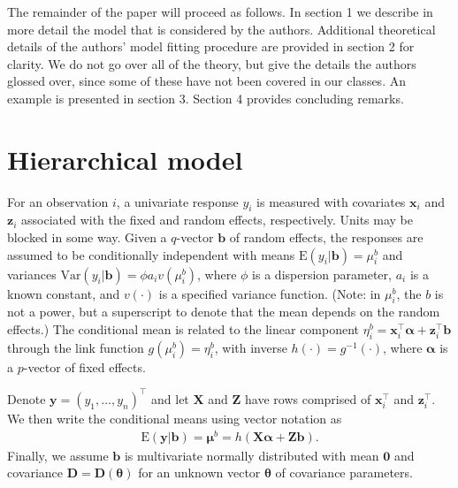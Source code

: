 \documentclass[12pt]{article}
\newcommand{\m}[1]{\mathbf{\bm{#1}}}
\newcommand{\E}{\mathrm{E}}
\newcommand{\Var}{\mathrm{Var}}
\begin{document}
The remainder of the paper will proceed as follows. In section 1 we describe in more detail the model that is considered by the authors. Additional theoretical details of the authors' model fitting procedure are provided in section 2 for clarity. We do not go over all of the theory, but give the details the authors glossed over, since some of these have not been covered in our classes. An example is presented in section 3. Section 4 provides concluding remarks.

\section{Hierarchical model}
 
\noindent For an observation $i$, a univariate response $y_i$ is measured with covariates $\m{x}_i$ and $\m{z}_i$ associated with the fixed and random effects, respectively. Units may be blocked in some way. Given a $q$-vector $\m{b}$ of random effects, the responses are assumed to be conditionally independent with means $\E(y_i|\m{b})=\mu_i^b$ and variances $\Var(y_i|\m{b}) = \phi a_i v(\mu_i^b)$, where $\phi$ is a dispersion parameter, $a_i$ is a known constant, and $v(\cdot)$ is a specified variance function. (Note: in $\mu_i^b$, the $b$ is not a power, but a superscript to denote that the mean depends on the random effects.) The conditional mean is related to the linear component $\eta_i^b=\m{x}_i^\top\m{\alpha}+\m{z}_i^\top\m{b}$ through the link function $g(\mu_i^b)=\eta_i^b$, with inverse $h(\cdot)=g^{-1}(\cdot)$, where $\m{\alpha}$ is a $p$-vector of fixed effects.

Denote $\m{y}=(y_1,\ldots,y_n)^\top$ and let $\m{X}$ and $\m{Z}$ have rows comprised of $\m{x}_i^\top$ and $\m{z}_i^\top$. We then write the conditional means using vector notation as
\begin{eqnarray}
\E(\m{y}|\m{b}) = \m{\mu}^b = h(\m{X}\m{\alpha} + \m{Z}\m{b}).
\label{mod}
\end{eqnarray}
Finally, we assume $\m{b}$ is multivariate normally distributed with mean $\m{0}$ and covariance $\m{D}=\m{D}(\m{\theta})$ for an unknown vector $\m{\theta}$ of covariance parameters.
\end{document}
